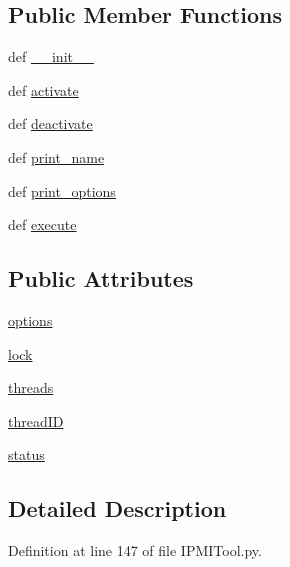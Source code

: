 \subsection*{Public Member Functions}
\begin{DoxyCompactItemize}
\item 
def \hyperlink{classIPMITool_1_1IPMITool_a5de40b2861cf82d75b68d65a00f56fd7}{\-\_\-\-\_\-init\-\_\-\-\_\-}
\item 
def \hyperlink{classIPMITool_1_1IPMITool_a7033e64733a6165c392c71159c75405c}{activate}
\item 
def \hyperlink{classIPMITool_1_1IPMITool_a7639dc29d494f89f9cd00c164984a014}{deactivate}
\item 
def \hyperlink{classIPMITool_1_1IPMITool_ad99bf0f2639b3f838e1c94efd64e24ad}{print\-\_\-name}
\item 
def \hyperlink{classIPMITool_1_1IPMITool_a40df31a86acffb30ca43ab938bd936ab}{print\-\_\-options}
\item 
def \hyperlink{classIPMITool_1_1IPMITool_a308c802b6dcf01604da2538f72cb2126}{execute}
\end{DoxyCompactItemize}
\subsection*{Public Attributes}
\begin{DoxyCompactItemize}
\item 
\hyperlink{classIPMITool_1_1IPMITool_a9f0f9484b1b8f6a0df8338f7894c8823}{options}
\item 
\hyperlink{classIPMITool_1_1IPMITool_a36a9429fca7200e0a6d1d78002b95d11}{lock}
\item 
\hyperlink{classIPMITool_1_1IPMITool_a2f6ca8b0b509ba2c514b72312841b2d6}{threads}
\item 
\hyperlink{classIPMITool_1_1IPMITool_aaa15d2dc90d9e3a45adc4519912c811d}{thread\-I\-D}
\item 
\hyperlink{classIPMITool_1_1IPMITool_a4dba85133ceca9edff481c575cb468d9}{status}
\end{DoxyCompactItemize}


\subsection{Detailed Description}


Definition at line 147 of file I\-P\-M\-I\-Tool.\-py.



